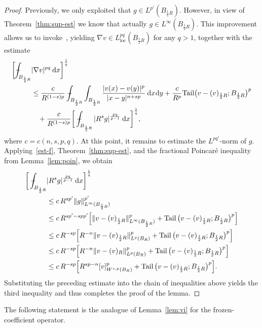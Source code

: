 \documentclass[10pt,letterpaper]{amsart}
\theoremstyle{definition}
\numberwithin{theorem}{section}
\numberwithin{equation}{section}
\newcommand{\mint}{- \mskip-19,5mu \int}
\newcommand{\1}{\ensuremath{\mathds{1}}}
\def\Xint#1{\mathchoice
    {\XXint\displaystyle\textstyle{#1}}%
    {\XXint\textstyle\scriptstyle{#1}}%
    {\XXint\scriptstyle\scriptscriptstyle{#1}}%
    {\XXint\scriptscriptstyle\scriptscriptstyle{#1}}%
    \!\int}
\def\XXint#1#2#3{\setbox0=\hbox{$#1{#2#3}{\int}$}
    \vcenter{\hbox{$#2#3$}}\kern-0.5\wd0}
\def\bint{\Xint-}
\renewcommand{\d}{\:\! \mathrm{d}}
\DeclareMathOperator{\Tail}{Tail}
\numberwithin{equation}{section}
\begin{document}
\begin{proof}
Previously, we only exploited that $g \in L^{p'}(B_{\frac12 R})$. However, in view of Theorem~\ref{thm:sup-est} we know that actually $g \in L^\infty(B_{\frac12 R})$. This improvement allows us to invoke~\cite[Theorem~1.1 and Remark~1.2]{BDLM}, yielding $\nabla v \in L^{pq}_{\mathrm{loc}}(B_{\frac12 R})$ for any $q>1$, together with the estimate
\begin{align*}
    \bigg[ \bint_{B_{\frac14R}} & |\nabla v|^{pq} \, \d x \bigg]^\frac{1}{q} \\
    &\leq 
    \frac{c}{R^{(1-s)p}}
    \mint_{B_{\frac12R}}\int_{B_{\frac12R}}
    \frac{|v(x)-v(y)|^p}{|x-y|^{n+sp}}\,\d x\d y +
    \frac{c}{R^p}
    \mathrm{Tail}\big(v-(v)_{\frac12R}; B_{\frac12R}\big)^p \\
    &\phantom{\le\,} +
    \frac{c}{R^{(1-s)p}}\bigg[\mint_{B_{\frac12R}}
    |R^sg|^{\frac{pq}{p-1}}\,\d x\bigg]^\frac1q,
\end{align*}
where $c=c(n,s,p,q)$. 
At this point, it remains to estimate the $L^{pq'}$-norm of $g$. 
Applying~\eqref{est-f}, Theorem~\ref{thm:sup-est}, and the fractional Poincar\'e inequality from Lemma~\ref{lem:poin}, we obtain
 \begin{align*}
    \bigg[\mint_{B_{\frac12R}} &
    |R^sg|^{\frac{pq}{p-1}}\,\d x\bigg]^\frac1q \\
    &\le 
    c\,R^{sp'} \|g\|_{L^{\infty}(B_{\frac12 R})}^{p'} \\
    &\le 
    c\, R^{sp'-spp'}\Big[\|v-(v)_{\frac12 R}\|_{L^{\infty}(B_{\frac12 R})}^p +
    \Tail\big(v-(v)_{\frac12 R};B_{\frac12 R}\big)^p \Big]\\
    &\le 
    c\, R^{-sp}\Big[ R^{-n}\|v-(v)_{\frac12 R}\|^p_{L^{p}(B_{R})} +
    \Tail\big(v-(v)_{\frac12 R};B_{\frac12 R}\big)^p \Big]\\
    &\le 
    c\, R^{-sp}\Big[R^{-n} \|v-(v)_{R}\|^p_{L^{p}(B_{R})} +
    \Tail\big(v-(v)_{\frac12 R};B_{\frac12 R}\big)^p \Big]\\
    &\le 
    c\, R^{-sp} \Big[ R^{sp-n}[v]_{W^{s,p}(B_{R})}^p +
    \Tail\big(v-(v)_{\frac12 R};B_{\frac12 R}\big)^p\Big] .
\end{align*}
Substituting the preceding estimate into the chain of inequalities above 
yields the third inequality and thus completes the proof of the lemma.
\end{proof}

The following statement is the analogue of Lemma~\ref{lem:vi} for the frozen-coefficient operator.
\end{document}
